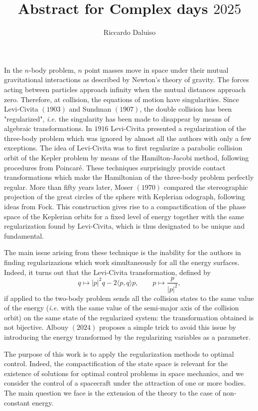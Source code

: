 \documentclass{article}
\title{Abstract for Complex days $2025$}
\author{Riccardo Daluiso}
\begin{document}
\maketitle

\section*{}

In the $n$-body problem, $n$ point masses move in space under their mutual gravitational interactions as described by Newton's theory of gravity. The forces acting between particles approach infinity when the mutual distances approach zero. Therefore, at collision, the equations of motion have singularities. Since Levi-Civita $(1903)$ and Sundman $(1907)$, the double collision has been "regularized", \emph{i.e.} the singularity has been made to disappear by means of algebraic transformations. In $1916$ Levi-Civita presented a regularization of the three-body problem which was ignored by almost all the authors with only a few exceptions. The idea of Levi-Civita was to first regularize a parabolic collision orbit of the Kepler problem by means of the Hamilton-Jacobi method, following procedures from Poincaré. These techniques surprisingly provide contact transformations which make the Hamiltonian of the three-body problem perfectly regular. 
More than fifty years later, Moser $(1970)$ compared the stereographic projection of the great circles of the sphere with Keplerian odograph, following ideas from Fock. This construction gives rise to a compactification of the phase space of the Keplerian orbits for a fixed level of energy together with the same regularization found by Levi-Civita, which is thus designated to be unique and fundamental. 
\par The main issue arising from these technique is the inability for the authors in finding regularizazions which work simultaneously for all the energy surfaces. Indeed, it turns out that the Levi-Civita transformation, defined by
\[
q \mapsto |p|^2q - 2 \langle  p , q \rangle p, \qquad p \mapsto \frac{p}{|p|^2},
\]
 if applied to the two-body problem sends all the collision states to the same value of the energy (\emph{i.e.} with the same value of the semi-major axis of the collision orbit) on the same state of the regularized system: the transformation obtained is not bijective. Albouy $(2024)$ proposes a simple trick to avoid this issue by introducing the energy transformed by the regularizing variables as a parameter. 
 \par The purpose of this work is to apply the regularization methods to optimal control. Indeed, the compactification of the state space is relevant for the existence of solutions for optimal control problems in space mechanics, and we 
 consider the control of a spacecraft under the attraction of one or more bodies. The main question we face is the extension of the theory to the case of non-constant energy.
 
\end{document}
